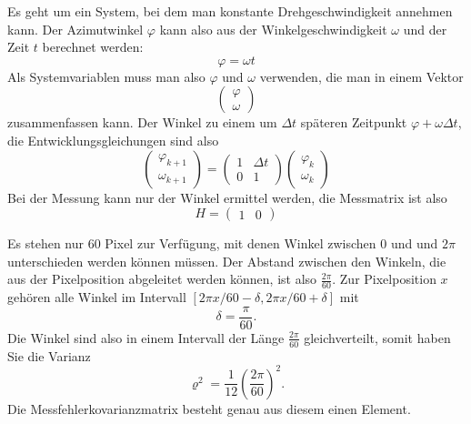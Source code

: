 \begin{loesung}
\begin{teilaufgaben}
\item
Es geht um ein System, bei dem man konstante Drehgeschwindigkeit annehmen
kann.
Der Azimutwinkel $\varphi$ kann also aus der Winkelgeschwindigkeit
$\omega$ und der Zeit $t$ berechnet werden:
\[
\varphi=\omega t
\]
Als Systemvariablen muss man also $\varphi$ und $\omega$ verwenden,
die man in einem Vektor
\[
\begin{pmatrix}\varphi\\\omega\end{pmatrix}
\]
zusammenfassen kann. Der Winkel zu einem um $\Delta t$ späteren Zeitpunkt
$\varphi+\omega\Delta t$, die Entwicklungsgleichungen sind also
\[
\begin{pmatrix}\varphi_{k+1}\\\omega_{k+1}\end{pmatrix}
=\begin{pmatrix}1&\Delta t\\0&1\end{pmatrix}
\begin{pmatrix}\varphi_k\\\omega_k\end{pmatrix}
\]
Bei der Messung kann nur der Winkel ermittel werden, die Messmatrix ist
also
\[
H=\begin{pmatrix}1&0\end{pmatrix}
\]
\item
Es stehen nur 60 Pixel zur Verfügung, mit denen Winkel zwischen $0$ und
und $2\pi$ unterschieden werden können müssen.
Der Abstand zwischen den Winkeln, die aus der Pixelposition abgeleitet
werden können, ist also $\frac{2\pi}{60}$. Zur Pixelposition $x$ gehören
alle Winkel im Intervall $[2\pi x/60-\delta, 2\pi x/60+\delta]$ mit
\[
\delta=\frac{\pi}{60}.
\]
Die Winkel sind also in einem Intervall der Länge $\frac{2\pi}{60}$ gleichverteilt,
somit haben Sie die Varianz
\[
\varrho^2=\frac1{12}\left(\frac{2\pi}{60}\right)^2.
\]
Die Messfehlerkovarianzmatrix besteht genau aus diesem einen Element.
\qedhere
\end{teilaufgaben}
\end{loesung}


